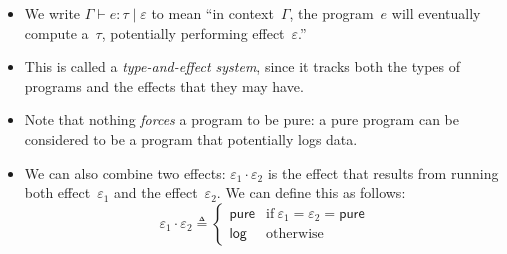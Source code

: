 \documentclass{lecturenotes}
\newcommand{\tabs}[3]{\ensuremath{\lambda #1 \colon #2.\,#3}}
\newcommand{\app}[2]{\ensuremath{#1\;#2}}
\newcommand{\unit}{\ensuremath{\textsf{(}\mkern0.5mu\textsf{)}}}
\newcommand{\pair}[2]{\ensuremath{(#1, #2)}}
\newcommand{\projl}[1]{\ensuremath{\pi_1\mkern2mu#1}}
\newcommand{\projr}[1]{\ensuremath{\pi_2\mkern3mu#1}}
\newcommand{\injl}[1]{\ensuremath{\textsf{inj}_1\mkern2mu#1}}
\newcommand{\injr}[1]{\ensuremath{\textsf{inj}_2\mkern3mu#1}}
\newcommand{\case}[5]{\ensuremath{\textsf{case}\mkern5mu#1\mkern5mu\textsf{of}\mkern5mu\injl{#2} \Rightarrow #3;\mkern5mu\injr{#4} \Rightarrow #5\mkern5mu\textsf{end}}}
\newcommand{\nillist}{\ensuremath{[\,]}}
\newcommand{\conslist}[2]{\ensuremath{#1 \mathop{::} #2}}
\newcommand{\lcase}[5]{\ensuremath{\textsf{case}\mkern5mu#1\mkern5mu\textsf{of}\mkern5mu\nillist\Rightarrow#2; \mkern5mu\conslist{#3}{#4} \Rightarrow #5\mkern5mu\textsf{end}}}
\newcommand{\logn}[1]{\ensuremath{\textsf{log}\mkern3mu#1}}
\newcommand{\pureeff}{\textsf{pure}\xspace}
\newcommand{\logeff}{\textsf{log}\xspace}
\begin{document}

\begin{itemize}
\item We write $\Gamma \vdash e : \tau \mid \varepsilon$ to mean ``in context~$\Gamma$, the program~$e$ will eventually compute a~$\tau$, potentially performing effect~$\varepsilon$.''
\item This is called a \emph{type-and-effect system}, since it tracks both the types of programs and the effects that they may have.
\item Note that nothing \emph{forces} a program to be pure: a pure program can be considered to be a program that potentially logs data.
\item We can also combine two effects: $\varepsilon_1 \cdot \varepsilon_2$ is the effect that results from running both effect~$\varepsilon_1$ and the effect~$\varepsilon_2$.
  We can define this as follows:
  $$
  \varepsilon_1 \cdot \varepsilon_2 \triangleq \left\{\begin{array}{ll} \pureeff & \text{if}~\varepsilon_1 = \varepsilon_2 = \pureeff\\ \logeff & \text{otherwise}\end{array}\right.
  $$
\end{itemize}
\end{document}
